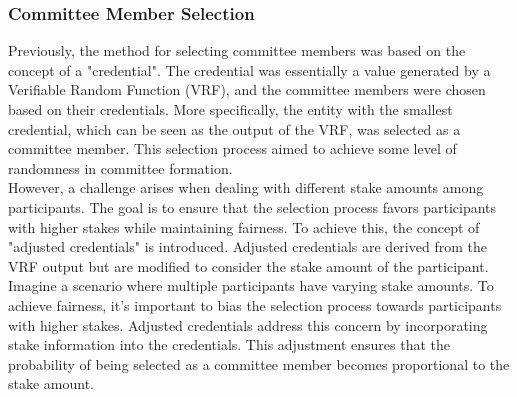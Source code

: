 \subsubsection{Committee Member Selection}
Previously, the method for selecting committee members was based on the concept of a "credential". The credential was essentially a value generated by a Verifiable Random Function (VRF), and the committee members were chosen based on their credentials. More specifically, the entity with the smallest credential, which can be seen as the output of the VRF, was selected as a committee member. This selection process aimed to achieve some level of randomness in committee formation.\\
However, a challenge arises when dealing with different stake amounts among participants. The goal is to ensure that the selection process favors participants with higher stakes while maintaining fairness. To achieve this, the concept of "adjusted credentials" is introduced. Adjusted credentials are derived from the VRF output but are modified to consider the stake amount of the participant.\\
Imagine a scenario where multiple participants have varying stake amounts. To achieve fairness, it's important to bias the selection process towards participants with higher stakes. Adjusted credentials address this concern by incorporating stake information into the credentials. This adjustment ensures that the probability of being selected as a committee member becomes proportional to the stake amount.

